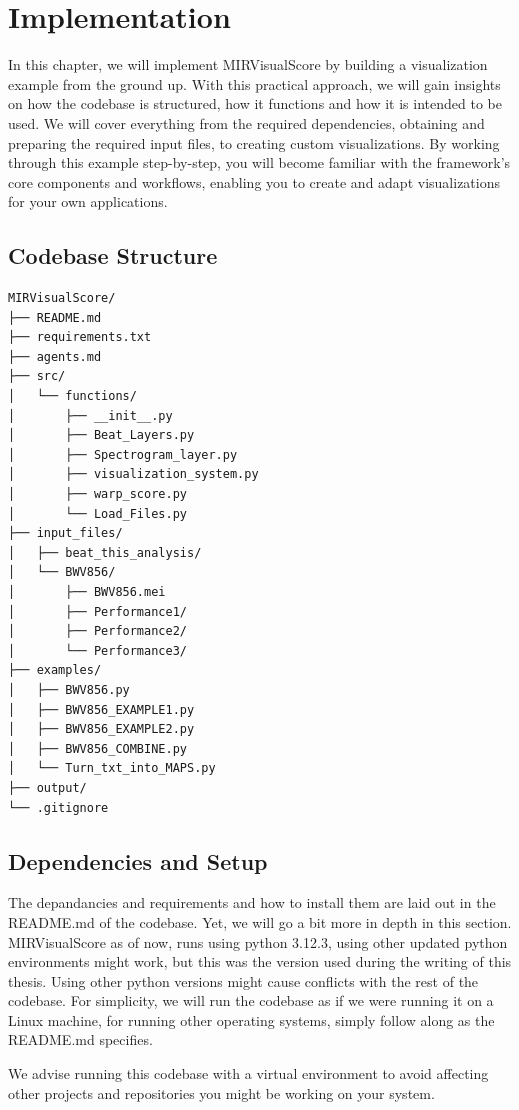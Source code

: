 \chapter{Implementation}\label{chap:chap4}
In this chapter, we will implement MIRVisualScore by building a visualization example from the ground up. With this practical approach, we will gain insights on how the codebase is structured, how it functions and how it is intended to be used. We will cover everything from the required dependencies, obtaining and preparing the required input files, to creating custom visualizations. By working through this example step-by-step, you will become familiar with the framework's core components and workflows, enabling you to create and adapt visualizations for your own applications. 

\newpage
\section{Codebase Structure}
\begin{Verbatim}
MIRVisualScore/
├── README.md
├── requirements.txt
├── agents.md
├── src/
│   └── functions/
│       ├── __init__.py
│       ├── Beat_Layers.py
│       ├── Spectrogram_layer.py
│       ├── visualization_system.py
│       ├── warp_score.py
│       └── Load_Files.py
├── input_files/
│   ├── beat_this_analysis/
│   └── BWV856/
│       ├── BWV856.mei
│       ├── Performance1/
│       ├── Performance2/
│       └── Performance3/
├── examples/
│   ├── BWV856.py
│   ├── BWV856_EXAMPLE1.py
│   ├── BWV856_EXAMPLE2.py
│   ├── BWV856_COMBINE.py
│   └── Turn_txt_into_MAPS.py
├── output/
└── .gitignore
\end{Verbatim}

\section{Dependencies and Setup}
The depandancies and requirements and how to install them are laid out in the README.md of the codebase. Yet, we will go a bit more in depth in this section. MIRVisualScore as of now, runs using python 3.12.3, using other updated python environments might work, but this was the version used during the writing of this thesis. Using other python versions might cause conflicts with the rest of the codebase. For simplicity, we will run the codebase as if we were running it on a Linux machine, for running other operating systems, simply follow along as the README.md specifies. 

We advise running this codebase with a virtual environment to avoid affecting other projects and repositories you might be working on your system.

